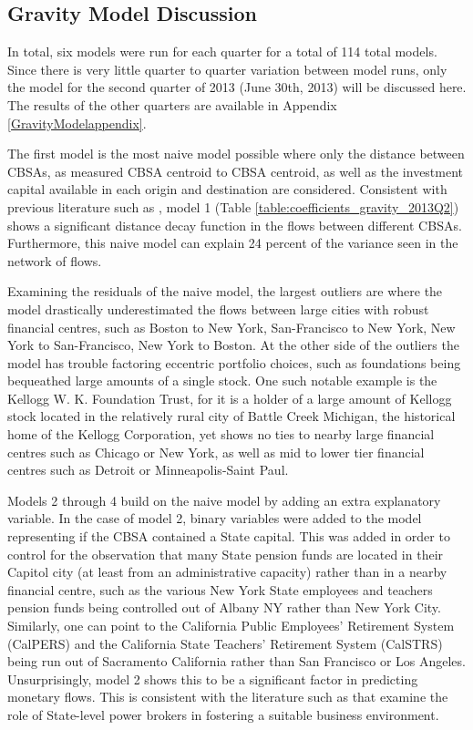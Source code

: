 \subsection{Gravity Model Discussion}

In total, six models were run for each quarter for a total of 114 total models.  Since there is very little quarter to quarter variation between model runs, only the model for the second quarter of 2013 (June 30th, 2013) will be discussed here.  The results of the other quarters are available in Appendix \ref{GravityModelappendix}.  

The first model is the most naive model possible where only the distance between CBSAs, as measured CBSA centroid to CBSA centroid, as well as the investment capital available in each origin and destination are considered.  Consistent with previous literature such as \cite{Green1995,gravesthe1998,covalhome1999,covalthe2001,Dovak2005}, model 1 (Table \ref{table:coefficients_gravity_2013Q2}) shows a significant distance decay function in the flows between different CBSAs. Furthermore, this naive model can explain 24 percent of the variance seen in the network of flows.  

Examining the residuals of the naive model, the largest outliers are where the model drastically underestimated the flows between large cities with robust financial centres, such as Boston to New York, San-Francisco to New York, New York to San-Francisco, New York to Boston. At the other side of the outliers the model has trouble factoring eccentric portfolio choices, such as foundations being bequeathed large amounts of a single stock.  One such notable example is the Kellogg W. K. Foundation Trust, for it is a holder of a large amount of Kellogg stock located in the relatively rural city of Battle Creek Michigan, the historical home of the Kellogg Corporation, yet shows no ties to nearby large financial centres such as Chicago or New York, as well as mid to lower tier financial centres such as Detroit or Minneapolis-Saint Paul.  

Models 2 through 4 build on the naive model by adding an extra explanatory variable.  In the case of model 2, binary variables were added to the model representing if the CBSA contained a State capital.  This was added in order to control for the observation that many State pension funds are located in their Capitol city (at least from an administrative capacity) rather than in a nearby financial centre, such as the various New York State employees and teachers pension funds being controlled out of Albany NY rather than New York City.  Similarly, one can point to the California Public Employees' Retirement System  (CalPERS) and the California State Teachers' Retirement System (CalSTRS) being run out of Sacramento California rather than San Francisco or Los Angeles.  Unsurprisingly, model 2 shows this to be a significant factor in predicting monetary flows. This is consistent with the literature such as \cite{Bradley2016} that examine the role of State-level power brokers in fostering a suitable business environment.

